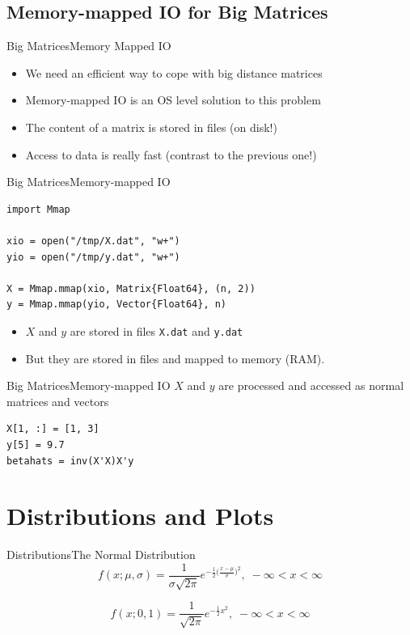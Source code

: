 \documentclass[11pt]{beamer}
\begin{document}
\subsection{Memory-mapped IO for Big Matrices}
\begin{frame}[fragile]{Big Matrices}{Memory Mapped IO}
	\begin{itemize}
		\item We need an efficient way to cope with big distance matrices 
		\item Memory-mapped IO is an OS level solution to this problem
		\item The content of a matrix is stored in files (on disk!)
		\item Access to data is really fast \Cooley (contrast to the previous one!)
	\end{itemize}
\end{frame} 

\begin{frame}[fragile]{Big Matrices}{Memory-mapped IO}
\begin{lstlisting}
import Mmap

xio = open("/tmp/X.dat", "w+")
yio = open("/tmp/y.dat", "w+")

X = Mmap.mmap(xio, Matrix{Float64}, (n, 2))
y = Mmap.mmap(yio, Vector{Float64}, n)		
\end{lstlisting}
\begin{itemize}
	\item $X$ and $y$ are stored in files \texttt{X.dat} and \texttt{y.dat}
	\item But they are stored in files and mapped to memory (RAM).
\end{itemize}
\end{frame}


\begin{frame}[fragile]{Big Matrices}{Memory-mapped IO}
$X$ and $y$ are processed and accessed as normal matrices and vectors
\begin{lstlisting}
X[1, :] = [1, 3]
y[5] = 9.7
betahats = inv(X'X)X'y
\end{lstlisting}
\end{frame}

\section{Distributions and Plots}
\begin{frame}[fragile]{Distributions}{The Normal Distribution}
\begin{equation}
f(x; \mu, \sigma) = \frac{1}{\sigma \sqrt{2\pi}} e^{-\frac{1}{2}\big(\frac{x - \mu}{\sigma}\big)^2}, \; -\infty < x < \infty
\end{equation}

\begin{equation}
	f(x; 0, 1) = \frac{1}{\sqrt{2\pi}} e^{-\frac{1}{2}x^2}, \; -\infty < x < \infty
\end{equation}
\end{frame}
\end{document}
